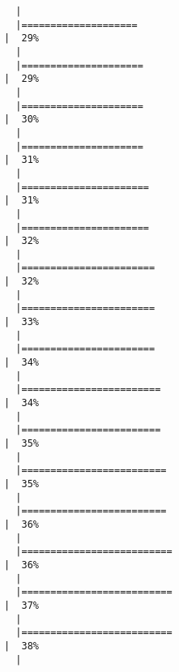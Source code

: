 \documentclass[12pt]{article}
\begin{document}
\begin{verbatim}
  |                                                                            
  |====================                                                  |  29%
  |                                                                            
  |=====================                                                 |  29%
  |                                                                            
  |=====================                                                 |  30%
  |                                                                            
  |=====================                                                 |  31%
  |                                                                            
  |======================                                                |  31%
  |                                                                            
  |======================                                                |  32%
  |                                                                            
  |=======================                                               |  32%
  |                                                                            
  |=======================                                               |  33%
  |                                                                            
  |=======================                                               |  34%
  |                                                                            
  |========================                                              |  34%
  |                                                                            
  |========================                                              |  35%
  |                                                                            
  |=========================                                             |  35%
  |                                                                            
  |=========================                                             |  36%
  |                                                                            
  |==========================                                            |  36%
  |                                                                            
  |==========================                                            |  37%
  |                                                                            
  |==========================                                            |  38%
  |                                                                            

\end{verbatim}
\end{document}
